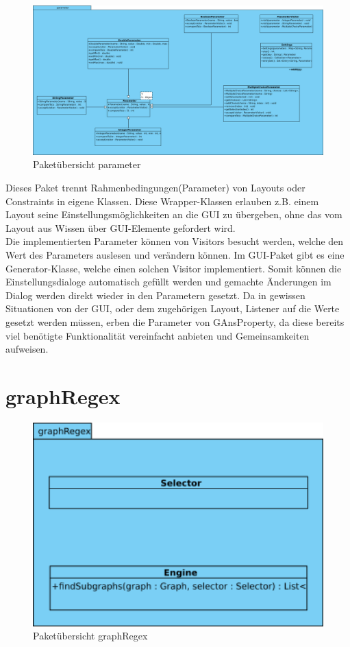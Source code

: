 \begin{figure}[hb]
  \centering
  \includegraphics[width=380pt]{resourcen/parameter.png}
  \caption{Paketübersicht parameter}
  \label{fig:packge_parameter}
\end{figure}

Dieses Paket trennt Rahmenbedingungen(Parameter) von Layouts oder Constraints in eigene Klassen. Diese Wrapper-Klassen erlauben z.B. einem Layout seine Einstellungsmöglichkeiten an die GUI zu übergeben, ohne das vom Layout aus Wissen über GUI-Elemente gefordert wird. \\Die implementierten Parameter können von Visitors besucht werden, welche den Wert des Parameters auslesen und verändern können. Im GUI-Paket gibt es eine Generator-Klasse, welche einen solchen Visitor implementiert. Somit können die Einstellungsdialoge automatisch gefüllt werden und gemachte Änderungen im Dialog werden direkt wieder in den Parametern gesetzt. Da in gewissen Situationen von der GUI, oder dem zugehörigen Layout, Listener auf die Werte gesetzt werden müssen, erben die Parameter von GAnsProperty, da diese bereits viel benötigte Funktionalität vereinfacht anbieten und Gemeinsamkeiten aufweisen.

\newpage

\section{graphRegex}

\begin{figure}[hb]
  \centering
  \includegraphics[width=380pt]{resourcen/graphRegex.png}
  \caption{Paketübersicht graphRegex}
  \label{fig:packge_graphRegex}
\end{figure}

